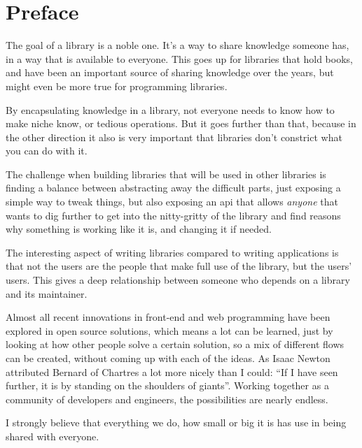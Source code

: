 
\chapter{Preface}%
\label{chp:preface}

The goal of a \gls{library} is a noble one. It's a way to share knowledge someone has, in a way that is available to everyone. This goes up for libraries that hold books, and have been an important source of sharing knowledge over the years, but might even be more true for programming libraries. 

By encapsulating knowledge in a \gls{library}, not everyone needs to know how to make niche know, or tedious operations. But it goes further than that, because in the other direction it also is very important that libraries don't constrict what you can do with it.

The challenge when building libraries that will be used in other libraries is finding a balance between abstracting away the difficult parts, just exposing a simple way to tweak things, but also exposing an \acrshort{api} that allows \emph{anyone} that wants to dig further to get into the nitty-gritty of the \gls{library} and find reasons why something is working like it is, and changing it if needed.

The interesting aspect of writing libraries compared to writing applications is that not the users are the people that make full use of the \gls{library}, but the users' users. This gives a deep relationship between someone who depends on a \gls{library} and its maintainer.

Almost all recent innovations in front-end and web programming have been explored in open source solutions, which means a lot can be learned, just by looking at how other people solve a certain solution, so a mix of different flows can be created, without coming up with each of the ideas. As Isaac Newton attributed\cite{newton-giants} Bernard of Chartres\cite{quote-giants-source} a lot more nicely than I could: ``If I have seen further, it is by standing on the shoulders of giants''. Working together as a community of developers and engineers, the possibilities are nearly endless.

I strongly believe that everything we do, how small or big it is has use in being shared with everyone.
